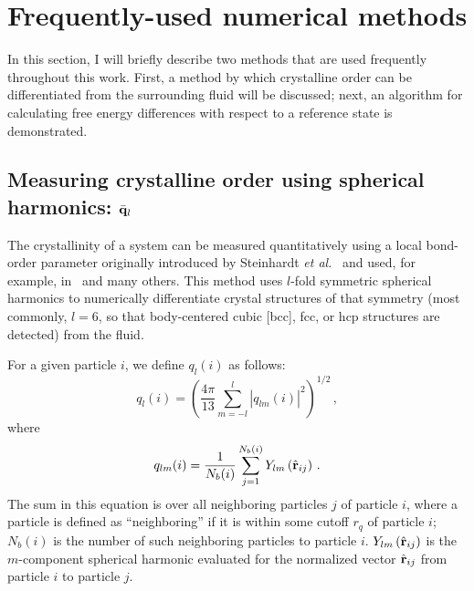 \section{Frequently-used numerical methods}
In this section, I will briefly describe two methods that are used frequently throughout this work.
First, a method by which crystalline order can be differentiated from the surrounding fluid will be discussed; next, an algorithm for calculating free energy differences with respect to a reference state is demonstrated.

\subsection{Measuring crystalline order using spherical harmonics: $\bar {\bf q}_l$}\label{sec:orderparamdesc}

The crystallinity of a system can be measured quantitatively using a local bond-order parameter originally introduced by Steinhardt \textit{et al.}~\cite{ronchetti} and used, for example, in~\cite{tenwolde,auer} and many others.
This method uses $l$-fold symmetric spherical harmonics to numerically differentiate crystal structures of that symmetry (most commonly, $l=6$, so that body-centered cubic [bcc], fcc, or hcp structures are detected) from the fluid.

For a given particle $i$, we define $q_l(i)$ as follows:
\begin{equation}
	q_l(i) = \left(\frac{4 \pi}{13} \sum_{m=-l}^{l} \left| q_{lm}(i) \right|^2\right)^{1/2} \,,
\end{equation}
where
\begin{equation}
	q_{lm}(i) = \frac{1}{N_b(i)} \sum_{j=1}^{N_b(i)}Y_{lm}\left(\hat{\bf r}_{ij}\right) \,.
\end{equation}
The sum in this equation is over all neighboring particles $j$ of particle $i$, where a particle is defined as ``neighboring'' if it is within some cutoff $r_q$ of particle $i$; $N_b(i)$ is the number of such neighboring particles to particle $i$.
$Y_{lm}\left(\hat{\bf r}_{ij}\right)$ is the $m$-component spherical harmonic evaluated for the normalized vector $\hat{\bf r}_{ij}$ from particle $i$ to particle $j$.

